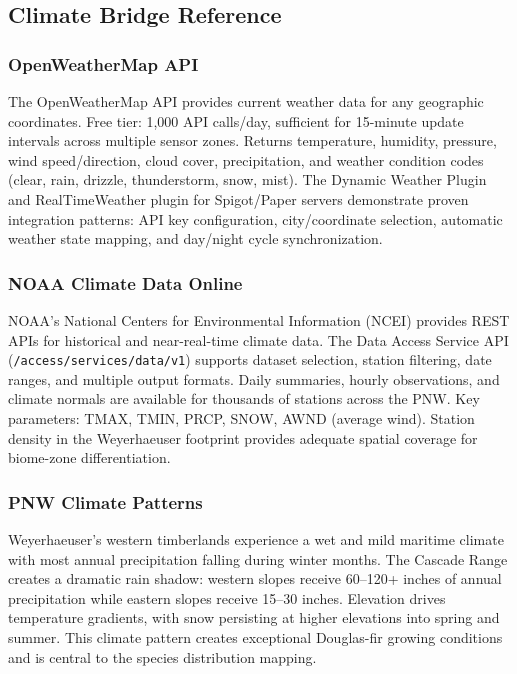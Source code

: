 \documentclass[11pt,letterpaper]{article}
\begin{document}
\subsection{Climate Bridge Reference}

\subsubsection{OpenWeatherMap API}
The OpenWeatherMap API provides current weather data for any geographic coordinates. Free tier: 1,000 API calls/day, sufficient for 15-minute update intervals across multiple sensor zones. Returns temperature, humidity, pressure, wind speed/direction, cloud cover, precipitation, and weather condition codes (clear, rain, drizzle, thunderstorm, snow, mist). The Dynamic Weather Plugin and RealTimeWeather plugin for Spigot/Paper servers demonstrate proven integration patterns: API key configuration, city/coordinate selection, automatic weather state mapping, and day/night cycle synchronization.

\subsubsection{NOAA Climate Data Online}
NOAA's National Centers for Environmental Information (NCEI) provides REST APIs for historical and near-real-time climate data. The Data Access Service API (\texttt{/access/services/data/v1}) supports dataset selection, station filtering, date ranges, and multiple output formats. Daily summaries, hourly observations, and climate normals are available for thousands of stations across the PNW. Key parameters: TMAX, TMIN, PRCP, SNOW, AWND (average wind). Station density in the Weyerhaeuser footprint provides adequate spatial coverage for biome-zone differentiation.

\subsubsection{PNW Climate Patterns}
Weyerhaeuser's western timberlands experience a wet and mild maritime climate with most annual precipitation falling during winter months. The Cascade Range creates a dramatic rain shadow: western slopes receive 60--120+ inches of annual precipitation while eastern slopes receive 15--30 inches. Elevation drives temperature gradients, with snow persisting at higher elevations into spring and summer. This climate pattern creates exceptional Douglas-fir growing conditions and is central to the species distribution mapping.
\end{document}
